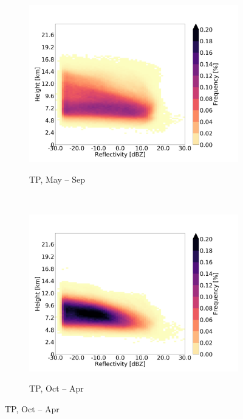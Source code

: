 \documentclass[alpha-refs]{wiley-article}
\begin{document}
\begin{figure}[!htbp]
    \begin{subfigure}[b]{0.5\textwidth}
       \centering
        \caption{TP,   May -- Sep}
        \includegraphics[width=\textwidth]{radar_reflect_TP_monsoonseason.png}
        \label{fig:CFAD1}

    \end{subfigure}%
    ~ 
    \begin{subfigure}[b]{0.5\textwidth}
        \centering
        \caption{TP,  Oct -- Apr }        
        \includegraphics[width=\textwidth]{radar_reflect_TP_westerlyseason.png}
        \label{fig:CFAD2}
\end{subfigure}


\end{figure}
\end{document}

